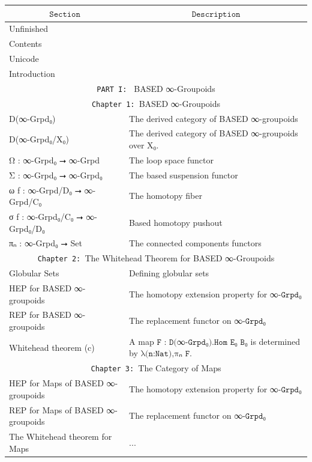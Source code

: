 \documentclass{book}
\theoremstyle{definition}
\begin{document}
{
\footnotesize
\begin{longtable}{|| l || l ||} 
\hline
\multicolumn{1}{||c||}{$\texttt{Section}$} & \multicolumn{1}{|c||}{$\texttt{Description}$} \\
\hline
\hline
Unfinished & \\
\hline
Contents & \\
\hline
Unicode & \\
\hline
Introduction & \\
\hline \hline
\multicolumn{2}{||c||}{\texttt{PART I: } BASED ∞-Groupoids} \\
\hline \hline
\multicolumn{2}{||c||}{\texttt{Chapter 1: }BASED ∞-Groupoids} \\
\hline \hline
D(∞-Grpd₀) & The derived category of BASED ∞-groupoids \\
\hline
D(∞-Grpd₀/X₀) & The derived category of BASED ∞-groupoids over X₀. \\
\hline
Ω : ∞-Grpd₀ ⭢ ∞-Grpd & The loop space functor \\
\hline
Σ : ∞-Grpd₀ ⭢ ∞-Grpd₀ & The based suspension functor \\
\hline 
ω f : ∞-Grpd/D₀ ⭢ ∞-Grpd/C₀ & The homotopy fiber\\
\hline 
σ f : ∞-Grpd₀/C₀ ⭢ ∞-Grpd₀/D₀ & Based homotopy pushout \\
 \hline 
πₙ : ∞-Grpd₀ ⭢ Set & The connected components functors\\
 \hline \hline
  \multicolumn{2}{||c||}{\texttt{Chapter 2: }The Whitehead Theorem for BASED ∞-Groupoids} \\
\hline \hline
Globular Sets & Defining globular sets\\
\hline
HEP for BASED ∞-groupoids & The homotopy extension property for ∞$\texttt{-Grpd}$₀\\
 \hline 
REP for BASED ∞-groupoids & The replacement functor on ∞$\texttt{-Grpd}$₀ \\
\hline
Whitehead theorem (c) & A map $\texttt{F : D(}$∞$\texttt{-Grpd₀).Hom E₀ B₀}$ is determined by $\texttt{λ(n:Nat),πₙ F}$. \\
\hline \hline
  \multicolumn{2}{||c||}{\texttt{Chapter 3: }The Category of Maps} \\
\hline \hline
HEP for Maps of BASED ∞-groupoids & The homotopy extension property for ∞$\texttt{-Grpd}$₀\\
 \hline 
REP for Maps of BASED ∞-groupoids & The replacement functor on ∞$\texttt{-Grpd}$₀ \\
\hline
The Whitehead theorem for Maps & ... \\

\end{longtable}}
\end{document}
